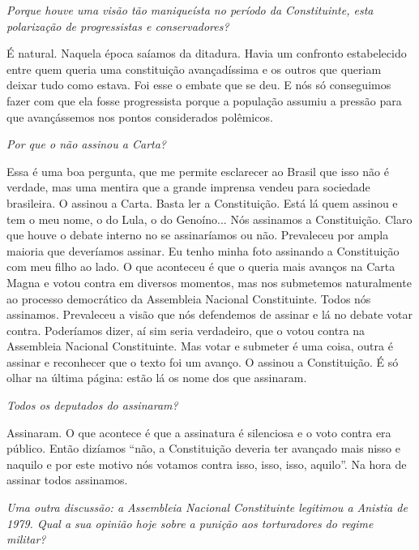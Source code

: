 \medskip

\noindent\emph{Porque houve uma visão tão maniqueísta no período da
Constituinte, esta polarização de progressistas e conservadores?}

É natural. Naquela época saíamos da ditadura. Havia um
confronto estabelecido entre quem queria uma constituição avançadíssima
e os outros que queriam deixar tudo como estava. Foi esse o embate que
se deu. E nós só conseguimos fazer com que ela fosse progressista porque
a população assumiu a pressão para que avançássemos nos pontos
considerados polêmicos.

\medskip

\noindent\emph{Por que o  não assinou a Carta?}

Essa é uma boa pergunta, que me permite esclarecer ao
Brasil que isso não é verdade, mas uma mentira que a grande imprensa
vendeu para sociedade brasileira. O  assinou a Carta. Basta ler a
Constituição. Está lá quem assinou e tem o meu nome, o do Lula, o do
Genoíno... Nós assinamos a Constituição. Claro que houve o debate
interno no  se assinaríamos ou não. Prevaleceu por ampla maioria que
deveríamos assinar. Eu tenho minha foto assinando a Constituição com meu
filho ao lado. O que aconteceu é que o  queria mais avanços na Carta
Magna e votou contra em diversos momentos, mas nos submetemos
naturalmente ao processo democrático da Assembleia Nacional
Constituinte. Todos nós assinamos. Prevaleceu a visão que nós defendemos
de assinar e lá no debate votar contra. Poderíamos dizer, aí sim seria
verdadeiro, que o  votou contra na Assembleia Nacional Constituinte.
Mas votar e submeter é uma coisa, outra é assinar e reconhecer que o
texto foi um avanço. O  assinou a Constituição. É só olhar na última
página: estão lá os nome dos que assinaram.

\medskip

\noindent\emph{Todos os deputados do  assinaram?}

Assinaram. O que acontece é que a assinatura é silenciosa
e o voto contra era público. Então dizíamos ``não, a Constituição
deveria ter avançado mais nisso e naquilo e por este motivo nós votamos
contra isso, isso, isso, aquilo''. Na hora de assinar todos assinamos.

\medskip

\noindent\emph{Uma outra discussão: a Assembleia Nacional Constituinte
legitimou a Anistia de 1979. Qual a sua opinião hoje sobre a punição aos
torturadores do regime militar?}

